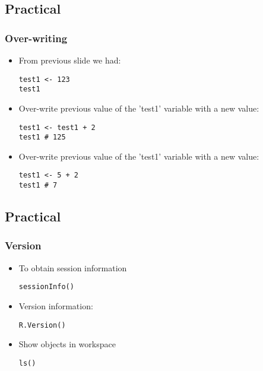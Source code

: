 \documentclass[11pt]{beamer}
\begin{document}
\subsection{Practical}
\begin{frame}[fragile]
\frametitle{Over-writing}
\begin{itemize}
\item From previous slide we had:
\begin{verbatim}
test1 <- 123 
test1
\end{verbatim}
\vspace{0.1in}
\item Over-write previous value of the ’test1’ variable with a new value:
\begin{verbatim}
test1 <- test1 + 2
test1 # 125
\end{verbatim}
\vspace{0.1in}
\item Over-write previous value of the ’test1’ variable with a new value:
\begin{verbatim}
test1 <- 5 + 2
test1 # 7
\end{verbatim}
\end{itemize}
\end{frame}


\subsection{Practical}
\begin{frame}[fragile]
\frametitle{Version}
\begin{itemize}
\item To obtain session information
\begin{verbatim}
sessionInfo()
\end{verbatim}
\vspace{0.1in}
\item Version information:
\begin{verbatim}
R.Version()
\end{verbatim}
\vspace{0.1in}
\item Show objects in workspace
\begin{verbatim}
ls()
\end{verbatim}
\end{itemize}
\end{frame}
\end{document}

